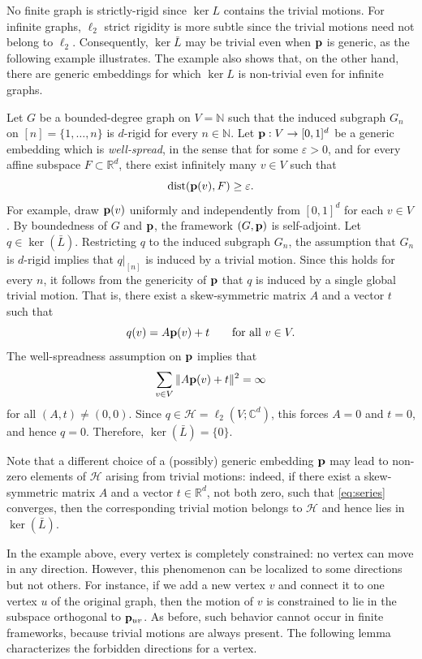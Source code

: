 \documentclass[reqno,english]{amsart}
\numberwithin{equation}{section}
\theoremstyle{definition}{
\newtheorem{example}[theorem]{Example}
\newtheorem{definition}[theorem]{Definition}
\newtheorem*{definition*}{Definition}
\newtheorem{problem}[theorem]{Problem}
\newtheorem{question}[theorem]{Question}
}
\newcommand{\N}{\mathbb N}
\newcommand{\R}{\mathbb R}
\newcommand{\C}{\mathbb C}
\newcommand{\cH}{\mathcal H}
\newcommand{\p}{{\bf p}}
\DeclareMathOperator{\dist}{dist}
\begin{document}
No finite graph is strictly-rigid since \(\ker L\) contains the trivial motions.
For infinite graphs, $\ell_2$ strict rigidity is more subtle since the trivial motions need not belong to
\(\ell_2\). Consequently, \(\ker \bar L\) may be trivial even when
\(\p\) is generic, as the following example illustrates. The example
also shows that, on the other hand, there are generic
embeddings for which \(\ker L\) is non-trivial even for infinite graphs.

\begin{example}\label{ex:strictly_rigid}
Let $G$ be a bounded-degree graph on $V=\N$ such that the induced subgraph $G_n$ on
$[n]=\{1,\dots,n\}$ is $d$-rigid for every $n\in\N$. Let $\p:V\to[0,1]^d$ be a generic embedding which is \emph{well-spread}, in the sense that for some $\varepsilon>0$, and for every affine subspace $F\subset\R^d$, there exist infinitely many $v\in V$ such that
\[
\dist(\p(v),F)\ge \varepsilon.
\]
For example, draw $\p(v)$ uniformly and independently from $[0,1]^d$ for each $v\in V$.
By boundedness of $G$ and $\p$, the framework $(G,\p)$ is self-adjoint. Let $q\in\ker(\bar L)$. Restricting $q$ to the induced subgraph $G_n$, the
assumption that $G_n$ is $d$-rigid implies that $q|_{[n]}$ is induced by a trivial motion. Since this holds for every $n$, it follows from the genericity of $\p$ that $q$ is induced by a single global trivial motion. That is, there exist a skew-symmetric matrix $A$ and a vector $t$ such that
\[
q(v)=A\p(v)+t \qquad \text{for all } v\in V.
\]
The well-spreadness assumption on $\p$ implies that
\begin{equation}\label{eq:series}
\sum_{v\in V}\|A\p(v)+t\|^2 = \infty
\end{equation}
for all $(A,t)\neq(0,0)$. Since $q\in\cH=\ell_2(V;\C^d)$, this forces $A=0$ and $t=0$, and hence $q=0$. Therefore,
$
\ker(\bar L)=\{0\}.
$

Note that a different choice of a (possibly) generic embedding $\p$ may lead to non-zero elements of $\cH$ arising from trivial motions: indeed, if there exist a skew-symmetric matrix $A$ and a vector $t\in\R^d$, not both zero, such that \eqref{eq:series} converges, then the corresponding trivial motion belongs to $\cH$ and hence lies in $\ker(\bar L)$.
\end{example}

In the example above, every vertex is completely constrained: no vertex
can move in any direction. However, this phenomenon can be localized to
some directions but not others. For instance, if we add a new vertex \(v\)
and connect it to one vertex \(u\) of the original graph, then the motion
of \(v\) is constrained to lie in the subspace orthogonal to \(\p_{uv}\).
As before, such behavior cannot occur in finite frameworks, because
trivial motions are always present. The following lemma characterizes the
forbidden directions for a vertex.
\end{document}
